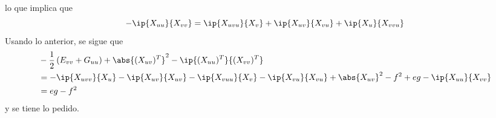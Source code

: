 \documentclass{article}
\begin{document}
\begin{enumerate}
\begin{align*}
    \end{align*}
    lo que implica que
    \begin{equation*}
        -\ip{X_{uu}}{X_{vv}}=\ip{X_{uvu}}{X_{v}}+\ip{X_{uv}}{X_{vu}}+\ip{X_{u}}{X_{vvu}}
    \end{equation*}
    Usando lo anterior, se sigue que
    \begin{align*}
        & -\frac{1}{2}\left(E_{vv}+G_{uu}\right)+\abs{(X_{uv})^{T}}^{2}-\ip{(X_{uu})^{T}}
        {(X_{vv})^{T}} \\
        &= -\ip{X_{uvv}}{X_{u}}-\ip{X_{uv}}{X_{uv}}-\ip{X_{vuu}}{X_{v}}-\ip{X_{vu}}{X_{vu}}
        +\abs{X_{uv}}^{2}-f^{2}+eg-\ip{X_{uu}}{X_{vv}} \\
        &= eg-f^{2}
    \end{align*}
    y se tiene lo pedido.


\end{enumerate}
\end{document}
